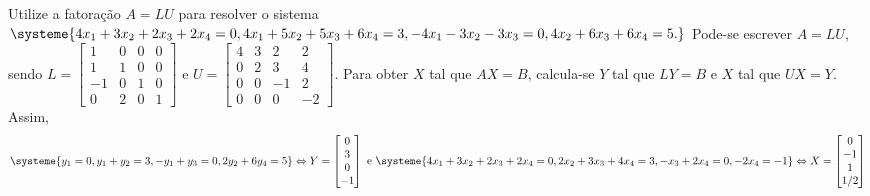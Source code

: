 \documentclass[12pt,a4paper]{article}
\begin{document}
\begin{ExerciseList}
\Exercise[title={2,5}]
Utilize a fatoração $A = LU$ para resolver o sistema
$
\systeme{
 4x_1 + 3x_2 + 2x_3 + 2x_4 = 0,  
 4x_1 + 5x_2 + 5x_3 + 6x_4 = 3,
-4x_1 - 3x_2 - 3x_3        = 0,
        4x_2 + 6x_3 + 6x_4 = 5.
}
$
\Answer Pode-se escrever $A = LU$, sendo
$
L = 
\begin{bmatrix}
 1 & 0 & 0 & 0 \\
 1 & 1 & 0 & 0 \\
-1 & 0 & 1 & 0 \\
 0 & 2 & 0 & 1
\end{bmatrix}
$
e
$
U = 
\begin{bmatrix}
4 & 3 &  2 &  2 \\
0 & 2 &  3 &  4 \\
0 & 0 & -1 &  2 \\
0 & 0 &  0 & -2
\end{bmatrix}
$.
Para obter $X$ tal que $AX = B$, calcula-se $Y$ tal que $LY = B$ e $X$ tal que $UX = Y$. Assim,
\[
\systeme{
 y_1                      = 0,  
 y_1 +  y_2               = 3,
-y_1         + y_3        = 0,
       2y_2        + 6y_4 = 5
}
\Leftrightarrow
Y =
\begin{bmatrix}
 0 \\
 3 \\
 0 \\
-1
\end{bmatrix}
\text{ e }
\systeme{
4x_1 + 3x_2 + 2x_3 + 2x_4 = 0,
       2x_2 + 3x_3 + 4x_4 = 3,
            -  x_3 + 2x_4 = 0,
                   - 2x_4 = -1
}
\Leftrightarrow
X = 
\begin{bmatrix}
 0 \\
-1 \\
 1 \\
1/2
\end{bmatrix}
\]




\end{ExerciseList}
\end{document}
